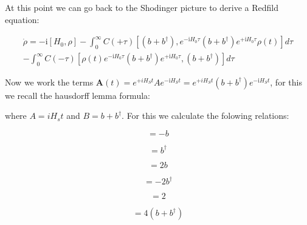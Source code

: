 \documentclass[%
preprint,
onecolumn,
notitlepag,
 amsmath,amssymb,
 aps,
 pra,
]{revtex4-2}
\begin{document}
At this point we can go back to the Shodinger picture to derive a Redfild equation: 

\begin{equation}
\begin{aligned}
\dot{\rho}=-\mathrm{i}\left[H_{0}, \rho\right]-\int_{0}^{\infty} C(+\tau)\left[\left(b+b^{\dagger}\right), e^{-\mathrm{i} H_{0} \tau}\left(b+b^{\dagger}\right) e^{+\mathrm{i} H_{0} \tau} \rho(t)\right] d \tau \\
-\int_{0}^{\infty} C(-\tau)\left[\rho(t) e^{-\mathrm{i} H_{0} \tau}\left(b+b^{\dagger}\right) e^{+\mathrm{i} H_{0} \tau},\left(b+b^{\dagger}\right)\right] d \tau
\end{aligned}
\end{equation}




Now we work the terms $\boldsymbol{A}(t) = e^{+i H_{S} t} A e^{-\mathrm{i} H_{S} t} = e^{+i H_{S} t} (b+b^{\dagger}) e^{-\mathrm{i} H_{S} t} $, for this we recall the hausdorff lemma formula:



where $A= i H_s t $ and $B= b+b^{\dagger} $. For this we calculate the folowing relations: 

\begin{equation}
    [ b^{\dagger}b ,    b   ] = -b 
\end{equation}

\begin{equation}
    [ b^{\dagger}b ,    b ^{\dagger}  ] = b ^{\dagger} 
\end{equation}




\begin{equation}
    [ bb ,    b ^{\dagger}  ] = 2b 
\end{equation}


\begin{equation}
    [ b^{\dagger}b^{\dagger} ,    b  ] = -2b^{\dagger} 
\end{equation}

\begin{equation}
    [  b+ b^{\dagger}  ,  -b+ b^{\dagger}   ] = 2
\end{equation}

\begin{equation}
    [ \left( b+ b^{\dagger} \right)^2 , \left( -b+ b^{\dagger} \right)  ] = 4\left( b+ b^{\dagger} \right) 
\end{equation}
\end{document}
